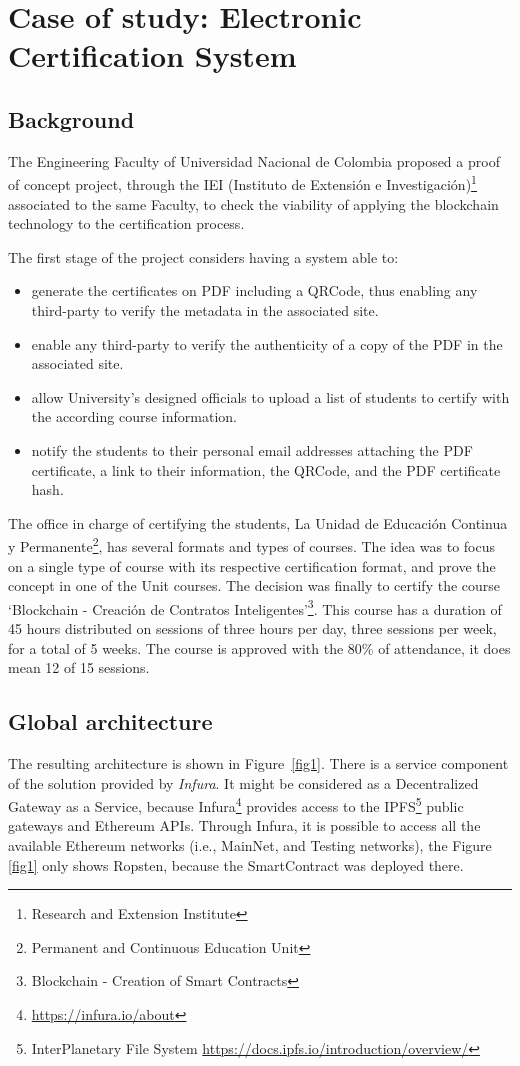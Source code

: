 \documentclass[runningheads]{llncs}
\begin{document}
\section{Case of study: Electronic Certification System}
\subsection{Background}
The Engineering Faculty of Universidad Nacional de Colombia proposed a proof of concept project, through the IEI (Instituto de Extensi\'{o}n e Investigaci\'{o}n)\footnote{Research and Extension Institute} associated to the same Faculty, to check the viability of applying the blockchain technology to the certification process.

The first stage of the project considers having a system able to:
\begin{itemize}
	\item generate the certificates on PDF including a QRCode, thus enabling any third-party to verify the metadata in the associated site.
	\item enable any third-party to verify the authenticity of a copy of the PDF in the associated site.
	\item allow University's designed officials to upload a list of students to certify with the according course information.
	\item notify the students to their personal email addresses attaching the PDF certificate, a link to their information, the QRCode, and the PDF certificate hash.
\end{itemize}

The office in charge of certifying the students, La Unidad de Educaci\'{o}n Continua y Permanente\footnote{Permanent and Continuous Education Unit}, has several formats and types of courses. The idea was to focus on a single type of course with its respective certification format, and prove the concept in one of the Unit courses. The decision was finally to certify the course `Blockchain - Creaci\'{o}n de Contratos Inteligentes'\footnote{Blockchain - Creation of Smart Contracts}. This course has a duration of 45 hours distributed on sessions of three hours per day, three sessions per week, for a total of 5 weeks. The course is approved with the 80\% of attendance, it does mean 12 of 15 sessions.

\subsection{Global architecture}
The resulting architecture is shown in Figure~\ref{fig1}. There is a service component of the solution provided by \emph{Infura}. It might be considered as a Decentralized Gateway as a Service, because Infura\footnote{\url{https://infura.io/about}} provides access to the IPFS\footnote{InterPlanetary File System \url{https://docs.ipfs.io/introduction/overview/}} public gateways and Ethereum APIs. Through Infura, it is possible to access all the available Ethereum networks (i.e., MainNet, and Testing networks), the Figure \ref{fig1} only shows Ropsten, because the SmartContract was deployed there.
\end{document}
